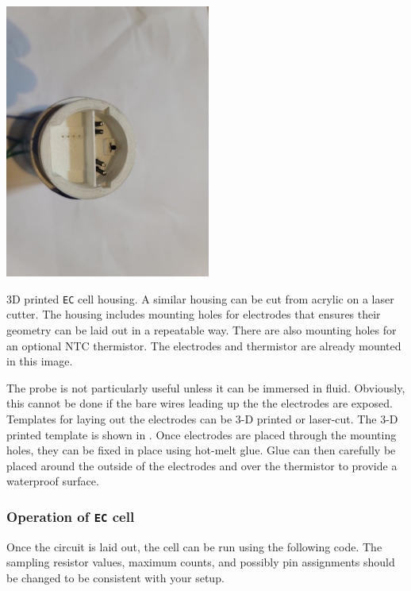 \begin{marginfigure}[6cm]
	\begin{center}
		\includegraphics[height=9cm]{Images/AppendixB_cap}
		\caption[3-D printed \texttt{EC cell} housing]{3D printed \texttt{EC} cell housing. A similar housing can be cut from acrylic on a laser cutter. The housing includes mounting holes for electrodes that ensures their geometry can be laid out in a repeatable way. There are also mounting holes for an optional NTC thermistor. The electrodes and thermistor are already mounted in this image.}
	\end{center}
\end{marginfigure}

The probe is not particularly useful unless it can be immersed in fluid. Obviously, this cannot be done if the bare wires leading up the the electrodes are exposed. Templates for laying out the electrodes can be 3-D printed or laser-cut.  The 3-D printed template is shown in . Once electrodes are placed through the mounting holes, they can be fixed in place using hot-melt glue. Glue can then carefully be placed around the outside of the electrodes and over the thermistor to provide a waterproof surface.

\subsubsection{Operation of \texttt{EC} cell}

Once the circuit is laid out, the cell can be run using the following code. The sampling resistor values, maximum \adc counts, and possibly pin assignments should be changed to be consistent with your setup.

